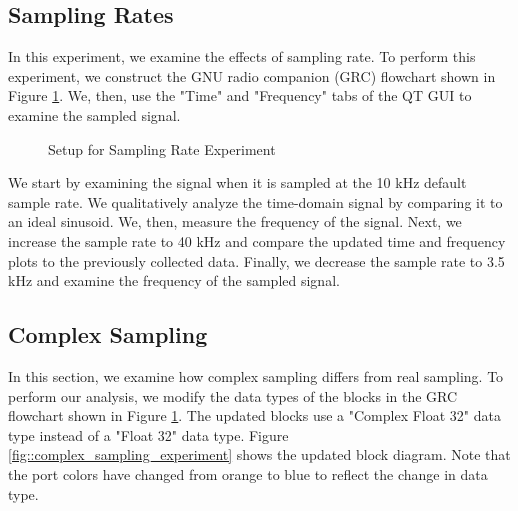 \documentclass{article}
\begin{document}
\subsection{Sampling Rates \label{subsection::sampling_rates}}

In this experiment, we examine the effects of sampling rate. To perform this experiment, we construct the GNU radio companion (GRC) flowchart shown in Figure \ref{fig::sampling_rates_experiment}. We, then, use the "Time" and "Frequency" tabs of the QT GUI to examine the sampled signal.

\begin{figure}[H]
	\centerline{}
	\caption{Setup for Sampling Rate Experiment}
	\label{fig::sampling_rates_experiment}
\end{figure}

We start by examining the signal when it is sampled at the 10 kHz default sample rate. We qualitatively analyze the time-domain signal by comparing it to an ideal sinusoid. We, then, measure the frequency of the signal. Next, we increase the sample rate to 40 kHz and compare the updated time and frequency plots to the previously collected data. Finally, we decrease the sample rate to 3.5 kHz and examine the frequency of the sampled signal.

\subsection{Complex Sampling \label{subsection::complex_sampling}}

In this section, we examine how complex sampling differs from real sampling. To perform our analysis, we modify the data types of the blocks in the GRC flowchart shown in Figure \ref{fig::sampling_rates_experiment}. The updated blocks use a "Complex Float 32" data type instead of a "Float 32" data type. Figure \ref{fig::complex_sampling_experiment} shows the updated block diagram. Note that the port colors have changed from orange to blue to reflect the change in data type.
\end{document}
